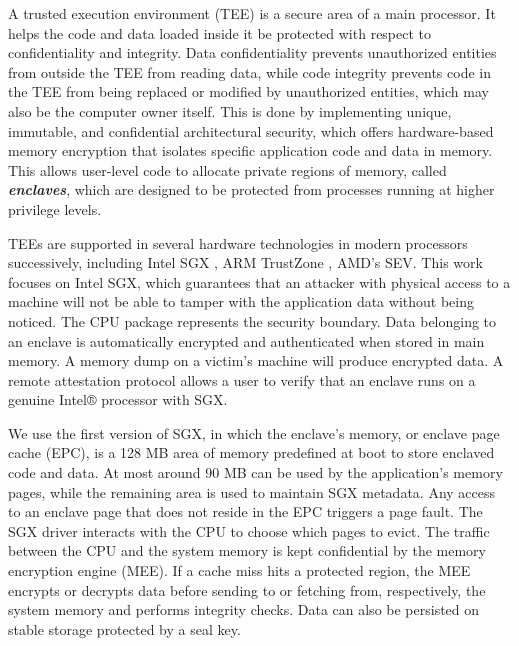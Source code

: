A trusted execution environment (TEE) is a secure area of a main processor. It helps the code and data loaded inside it be protected with respect to confidentiality and integrity. Data confidentiality prevents unauthorized entities from outside the TEE from reading data, while code integrity prevents code in the TEE from being replaced or modified by unauthorized entities, which may also be the computer owner itself. This is done by implementing unique, immutable, and confidential architectural security, which offers hardware-based memory encryption that isolates specific application code and data in memory. This allows user-level code to allocate private regions of memory, called \textbf{\textit{enclaves}}, which are designed to be protected from processes running at higher privilege levels.

TEEs are supported in several hardware technologies in modern processors successively, including Intel SGX \cite{SGX}, ARM TrustZone \cite{armtrustzone}, AMD's SEV. This work focuses on Intel SGX, which guarantees that an attacker with physical access to a machine will not be able to tamper with the application data without being noticed. The CPU package represents the security boundary. Data belonging to an enclave is automatically encrypted and authenticated when stored in main memory. A memory dump on a victim’s machine will produce encrypted data. A remote attestation protocol allows a user to verify that an enclave runs on a genuine Intel® processor with SGX. 



We use the first version of SGX, in which the enclave's memory, or enclave page cache (EPC), is a 128 MB area of memory predefined at boot to store enclaved code and data. At most around 90 MB can be used by the application’s memory pages, while the remaining area is used to maintain SGX metadata. Any access to an enclave page that does not reside in the EPC triggers a page fault. The SGX driver interacts with the CPU to choose which pages to evict. The traffic between the CPU and the system memory is kept confidential by the memory encryption engine (MEE). If a cache miss hits a protected region, the MEE encrypts or decrypts data before sending to or fetching from, respectively, the system memory and performs integrity checks. Data can also be persisted on stable storage protected by a seal key. 

